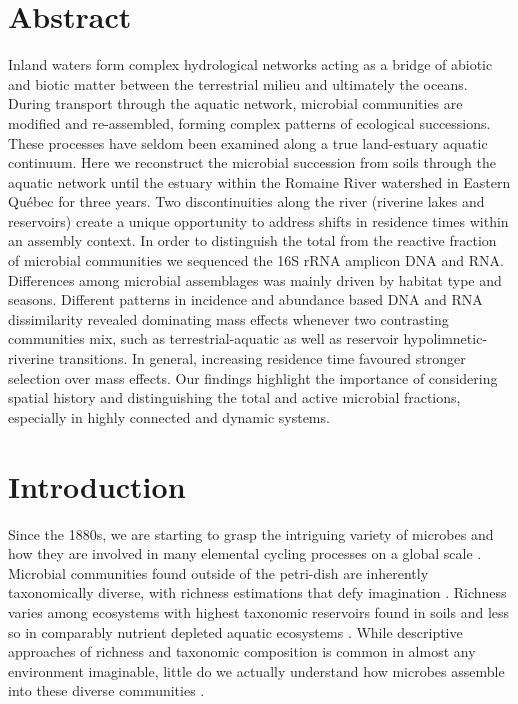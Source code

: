 \documentclass[12pt,a4paper]{article} %
\begin{document}
\section*{Abstract} %
Inland waters form complex hydrological networks acting as a bridge of abiotic and biotic matter between the terrestrial milieu and ultimately the oceans. During transport through the aquatic network, microbial communities are modified and re-assembled, forming complex patterns of ecological successions. These processes have seldom been examined along a true land-estuary aquatic continuum. Here we reconstruct the microbial succession from soils through the aquatic network until the estuary within the Romaine River watershed in Eastern Québec for three years. Two discontinuities along the river (riverine lakes and reservoirs) create a unique opportunity to address shifts in residence times within an assembly context. In order to distinguish the total from the reactive fraction of microbial communities we sequenced the 16S rRNA amplicon DNA and RNA. Differences among microbial assemblages was mainly driven by habitat type and seasons. Different patterns in incidence and abundance based DNA and RNA dissimilarity revealed dominating mass effects whenever two contrasting communities mix, such as terrestrial-aquatic as well as reservoir hypolimnetic-riverine transitions. In general, increasing residence time favoured stronger selection over mass effects. Our findings highlight the importance of considering spatial history and distinguishing the total and active microbial fractions, especially in highly connected and dynamic systems.


\setlength{\parindent}{1cm}
\section*{Introduction}
Since the 1880s, we are starting to grasp the intriguing variety of microbes and how they are involved in many elemental cycling processes on a global scale \citep{Caumette2015}. Microbial communities found outside of the petri-dish are inherently taxonomically diverse, with richness estimations that defy imagination \citep{Thompson2017, Louca2019}. Richness varies among ecosystems with highest taxonomic reservoirs found in soils and less so in comparably nutrient depleted aquatic ecosystems \citep{Thompson2017}. While descriptive approaches of richness and taxonomic composition is common in almost any environment imaginable, little do we actually understand how microbes assemble into these diverse communities \citep{Shade2017a, Shade2018}.
\end{document}
